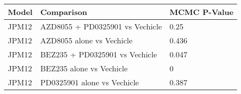 \begin{table}[ht]
\centering
\begin{tabular}{lll}
  \hline
Model & Comparison & MCMC P-Value \\ 
  \hline
JPM12 & AZD8055 + PD0325901 vs Vechicle & 0.25 \\ 
  JPM12 & AZD8055 alone vs Vechicle & 0.436 \\ 
  JPM12 & BEZ235 + PD0325901 vs Vechicle & 0.047 \\ 
  JPM12 & BEZ235 alone vs Vechicle & 0 \\ 
  JPM12 & PD0325901 alone vs Vechicle & 0.387 \\ 
   \hline
\end{tabular}
\end{table}
